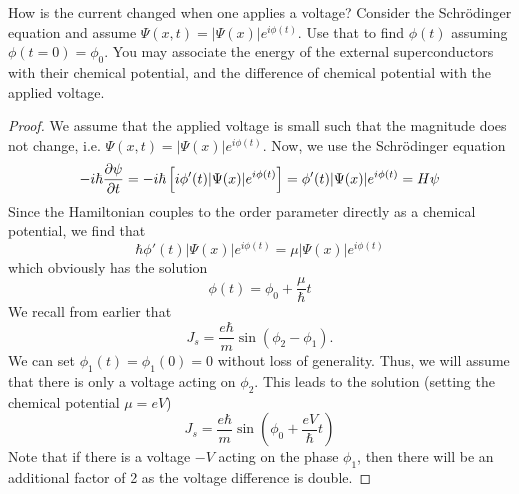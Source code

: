 \begin{Problem}
	How is the current changed when one applies a voltage? Consider the Schr\"{o}dinger equation and assume $\Psi(x,t) = |\Psi(x)|e^{i\phi(t)} $. Use that to find $\phi(t)$ assuming $\phi(t=0)=\phi_0$. You may associate the energy of the external superconductors with their chemical potential, and the difference of chemical potential with the applied voltage.	
\end{Problem}
\begin{proof}
We assume that the applied voltage is small such that the magnitude does not change, i.e. $\Psi(x,t) = |\Psi(x)|e^{i\phi(t)}$. Now, we use the Schr\"{o}dinger equation
\[-i\hbar \pdv{\psi}{t}=-i\hbar\left[i\phi'(t)|\Psi(x)|e^{i\phi(t)}\right] = \phi'(t) |\Psi(x)|e^{i\phi(t)}=H\psi\]
Since the Hamiltonian couples to the order parameter directly as a chemical potential, we find that
\[\hbar\phi'(t)|\Psi(x)|e^{i\phi(t)} = \mu |\Psi(x)|e^{i\phi(t)}\]
which obviously has the solution
\[\phi(t) = \phi_0 + \frac{\mu}{\hbar} t\]
We recall from earlier that
\[J_s = \frac{e\hbar}{m}\sin(\phi_2-\phi_1).\]
We can set $\phi_1(t) = \phi_1(0) =0$ without loss of generality. Thus, we will assume that there is only a voltage acting on $\phi_2$. This leads to the solution (setting the chemical potential $\mu=eV$)
\[J_s = \frac{e\hbar}{m} \sin\left(\phi_0 + \frac{eV}{\hbar} t\right)\]
Note that if there is a voltage $-V$ acting on the phase $\phi_1$, then there will be an additional factor of 2 as the voltage difference is double.
\end{proof}
